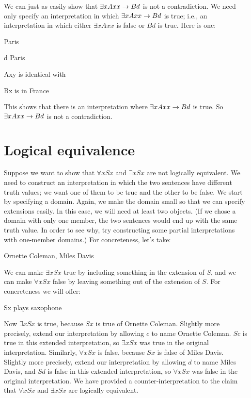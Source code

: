 We can just as easily show that $\exists xAxx \rightarrow Bd$ is not a contradiction. We need only specify an interpretation in which $\exists xAxx \rightarrow Bd$ is true; i.e., an interpretation in which either $\exists x Axx$ is false or $Bd$ is true. Here is one:
	\begin{ekey}
		\item[\text{domain}] Paris
		\item[d] Paris
		\item[Axy]  is identical with 
		\item[Bx]  is in France
	\end{ekey}
This shows that there is an interpretation where $\exists xAxx \rightarrow Bd$ is true. So $\exists x Axx \rightarrow Bd$ is not a contradiction.

\section{Logical equivalence}
Suppose we want to show that $\forall x Sx$ and $\exists x Sx$ are not logically equivalent. We need to construct an interpretation in which the two sentences have different truth values; we want one of them to be true and the other to be false. We start by specifying a domain. Again, we make the domain small so that we can specify extensions easily. In this case, we will need at least two objects. (If we chose a domain with only one member, the two sentences would end up with the same truth value. In order to see why, try constructing some partial interpretations with one-member domains.) For concreteness, let's take:
	\begin{ekey}
		\item[\text{domain}] Ornette Coleman, Miles Davis
	\end{ekey}
We can make $\exists x Sx$ true by including something in the extension of $S$, and we can make $\forall x Sx$ false by leaving something out of the extension of $S$. For concreteness we will offer:
	\begin{ekey}
		\item[Sx]  plays saxophone
	\end{ekey}
Now $\exists x Sx$ is true, because $Sx$ is true of Ornette Coleman. Slightly more precisely, extend our interpretation by allowing $c$ to name Ornette Coleman.  $Sc$ is true in this extended interpretation, so $\exists x Sx$ was true in the original interpretation. Similarly, $\forall x Sx$ is false, because $Sx$ is false of Miles Davis. Slightly more precisely, extend our interpretation by allowing $d$ to name Miles Davis, and $Sd$ is false in this extended interpretation, so $\forall x Sx$ was false in the original interpretation. We have provided a counter-interpretation to the claim that $\forall x Sx$ and $\exists x Sx$ are logically equivalent.

